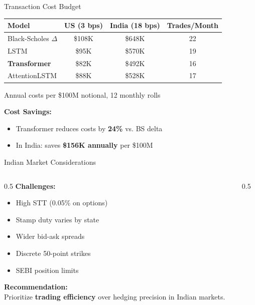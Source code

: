 \documentclass[aspectratio=169,11pt]{beamer}
\begin{document}
\begin{frame}{Transaction Cost Budget}
\begin{table}
\centering
\begin{tabular}{lccc}
\toprule
\textbf{Model} & \textbf{US (3 bps)} & \textbf{India (18 bps)} & \textbf{Trades/Month} \\
\midrule
Black-Scholes $\Delta$ & \$108K & \$648K & 22 \\
LSTM & \$95K & \$570K & 19 \\
\textbf{Transformer} & \$82K & \$492K & 16 \\
AttentionLSTM & \$88K & \$528K & 17 \\
\bottomrule
\end{tabular}
\end{table}
\small{Annual costs per \$100M notional, 12 monthly rolls}

\vspace{0.3cm}
\textbf{Cost Savings:}
\begin{itemize}
    \item Transformer reduces costs by \textbf{24\%} vs. BS delta
    \item In India: saves \textbf{\$156K annually} per \$100M
\end{itemize}
\end{frame}

\begin{frame}{Indian Market Considerations}
\begin{columns}
\begin{column}{0.5\textwidth}
\textbf{Challenges:}
\begin{itemize}
    \item High STT (0.05\% on options)
    \item Stamp duty varies by state
    \item Wider bid-ask spreads
    \item Discrete 50-point strikes
    \item SEBI position limits
\end{itemize}

\vspace{0.3cm}
\textbf{Recommendation:}\\
Prioritize \textbf{trading efficiency} over hedging precision in Indian markets.
\end{column}
\begin{column}{0.5\textwidth}
\end{column}
\end{columns}
\end{frame}
\end{document}
